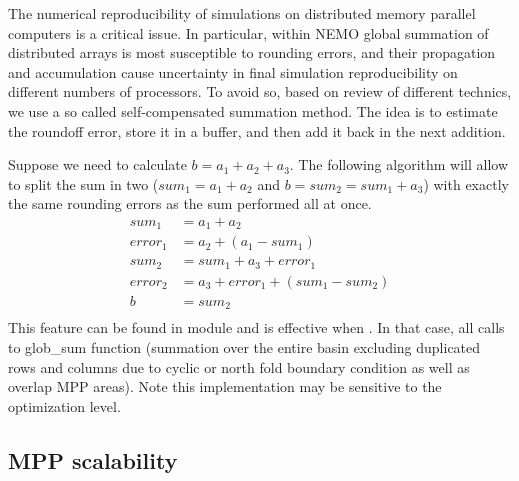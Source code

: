 The numerical reproducibility of simulations on distributed memory parallel computers 
is a critical issue. In particular, within NEMO global summation of distributed arrays 
is most susceptible to rounding errors, and their propagation and accumulation cause 
uncertainty in final simulation reproducibility on different numbers of processors.
To avoid so, based on \citet{He_Ding_JSC01} review of different technics, 
we use a so called self-compensated summation method. The idea is to estimate 
the roundoff error, store it in a buffer, and then add it back in the next addition. 

Suppose we need to calculate $b = a_1 + a_2 + a_3$. The following algorithm 
will allow to split the sum in two ($sum_1 = a_{1} + a_{2}$ and $b = sum_2 = sum_1 + a_3$) 
with exactly the same rounding errors as the sum performed all at once.
\begin{align*}
	sum_1 \ \  &= a_1 + a_2 \\
	error_1     &= a_2 + ( a_1 - sum_1 ) \\
	sum_2 \ \  &= sum_1 + a_3 + error_1 \\
	error_2     &= a_3 + error_1 + ( sum_1 - sum_2 ) \\
	b \qquad \ &= sum_2 \\
\end{align*}
This feature can be found in  module and is effective when .
In that case, all calls to glob\_sum function (summation over the entire basin excluding 
duplicated rows and columns due to cyclic or north fold boundary condition as well as 
overlap MPP areas). 
Note this implementation may be sensitive to the optimization level. 

\subsection{MPP scalability}
\label{MISC_mppsca}

